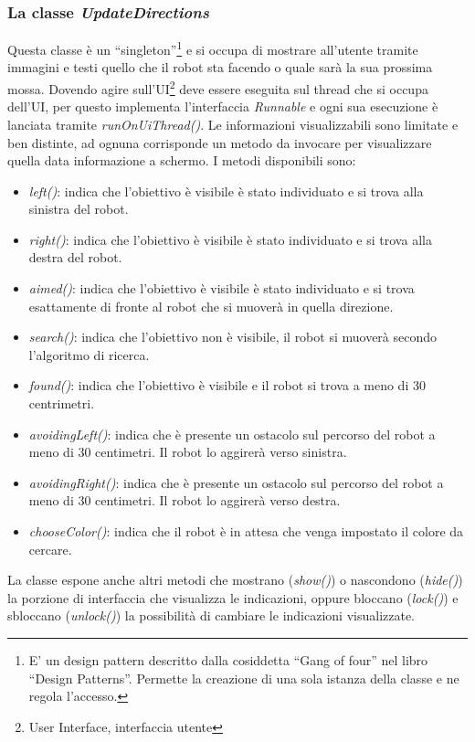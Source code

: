  \subsubsection{La classe \emph{UpdateDirections}}
 Questa classe è un ``singleton''\footnote{E' un design pattern descritto dalla 
 cosiddetta ``Gang of four'' nel libro ``Design Patterns''. 
 Permette la creazione di una sola istanza della classe e ne regola l'accesso. } 
 e si occupa di mostrare all'utente tramite  immagini e testi quello che  il 
 robot sta facendo o quale sarà la sua prossima  mossa. Dovendo agire 
 sull'UI\footnote{User Interface, interfaccia utente} deve essere eseguita sul thread
 che si occupa dell'UI, per questo implementa l'interfaccia \emph{Runnable} e 
 ogni sua esecuzione è lanciata  tramite \emph{runOnUiThread()}. 
 Le informazioni visualizzabili sono limitate e ben distinte,
 ad ognuna corrisponde un metodo da invocare per visualizzare quella data informazione
 a schermo. I metodi disponibili sono: 
 \begin{itemize}
 \item \emph{left()}: indica che l'obiettivo è visibile è stato individuato e si trova alla sinistra del robot.
 \item \emph{right()}: indica che l'obiettivo è visibile è stato individuato e si trova alla destra del robot.
 \item \emph{aimed()}: indica che l'obiettivo è visibile è stato individuato e si trova esattamente di fronte al robot che si muoverà in quella direzione.
 \item \emph{search()}: indica che l'obiettivo non è visibile, il robot si muoverà secondo l'algoritmo di ricerca.
 \item \emph{found()}: indica che l'obiettivo è visibile e il robot si trova a meno di 30 centrimetri.
 \item \emph{avoidingLeft()}: indica che è presente un ostacolo sul percorso del robot a meno di 30 centimetri. Il robot lo aggirerà verso sinistra. 
 \item \emph{avoidingRight()}: indica che è presente un ostacolo sul percorso del robot a meno di 30 centimetri. Il robot lo aggirerà verso destra.
 \item \emph{chooseColor()}: indica che il robot è in attesa che venga impostato il colore da cercare. 
 \end{itemize}
 La classe espone anche altri metodi che mostrano (\emph{show()}) o nascondono 
 (\emph{hide()}) la porzione di interfaccia che visualizza le indicazioni, oppure bloccano (\emph{lock()})
 e sbloccano (\emph{unlock()}) la possibilità di cambiare le indicazioni visualizzate.


